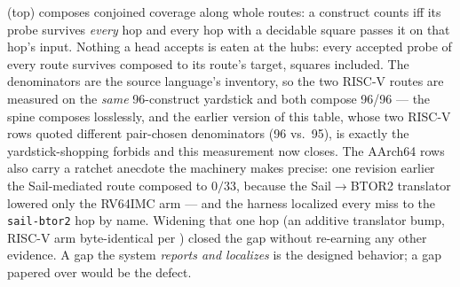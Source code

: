  (top) composes conjoined coverage along whole routes:
a construct counts iff its probe survives \emph{every} hop and every
hop with a decidable square passes it on that hop's input. Nothing a
head accepts is eaten at the hubs: every accepted probe of every route
survives composed to its route's target, squares included. The denominators are
the source language's inventory, so the two RISC-V routes are measured
on the \emph{same} 96-construct yardstick and both compose 96/96 ---
the spine composes losslessly, and the earlier version of this table,
whose two RISC-V rows quoted different pair-chosen denominators
(96 vs.\ 95), is exactly the yardstick-shopping 
forbids and this measurement now closes. The AArch64 rows also carry a ratchet
anecdote the machinery makes precise: one revision earlier the
Sail-mediated route composed to $0/33$, because the Sail$\to$BTOR2
translator lowered only the RV64IMC arm --- and the harness localized
every miss to the \texttt{sail-btor2} hop by name. Widening that one
hop (an additive translator bump, RISC-V arm byte-identical per
) closed the gap without re-earning any other
evidence. A gap the system \emph{reports and localizes} is the designed
behavior; a gap papered over would be the defect.

